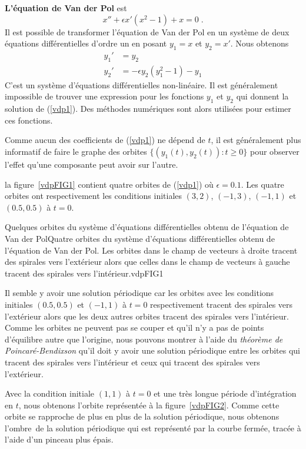 {\begin{egg}
{\bfseries L'équation de Van der Pol} est
\[
x'' + \epsilon x'(x^2-1) + x = 0 \; .
\]
Il est possible de transformer l'équation de Van der Pol en un système de
deux équations différentielles d'ordre un en posant $y_1 = x$ et $y_2 = x'$.
Nous obtenons
\begin{equation} \label{vdp1}
\begin{split}
y_1' &= y_2 \\
y_2' &= - \epsilon y_2 (y_1^2 -1) - y_1
\end{split}
\end{equation}
C'est un système d'équations différentielles non-linéaire.  Il est
généralement impossible de trouver une expression pour les fonctions $y_1$ et
$y_2$ qui donnent la solution de (\ref{vdp1}).  Des méthodes
numériques sont alors utilisées pour estimer ces fonctions.

Comme aucun des coefficients de (\ref{vdp1}) ne dépend de $t$, il est
généralement plus informatif de faire le graphe des orbites
$\{(y_1(t), y_2(t)) : t\geq 0 \}$ pour observer l'effet qu'une composante
peut avoir sur l'autre.

la figure~\ref{vdpFIG1} contient quatre orbites de (\ref{vdp1}) où
$\epsilon = 0.1$.  Les quatre orbites ont respectivement les conditions
initiales $(3,2)$, $(-1,3)$, $(-1,1)$ et $(0.5,0.5)$ à $t=0$.

{Quelques orbites du système d'équations différentielles obtenu de
l'équation de Van der Pol}{Quatre orbites du système d'équations
différentielles obtenu de l'équation de Van der Pol.  Les orbites dans
le champ de vecteurs à droite tracent des spirales vers l'extérieur
alors que celles dans le champ de vecteurs à gauche tracent des
spirales vers l'intérieur.}{vdpFIG1}

Il semble y avoir une solution périodique car les orbites avec les
conditions initiales $(0.5,0.5)$ et $(-1,1)$ à $t=0$ respectivement tracent
des spirales vers l'extérieur alors que les deux autres orbites tracent des
spirales vers l'intérieur.  Comme les orbites ne peuvent pas se couper et
qu'il n'y a pas de points d'équilibre autre que l'origine, nous
pouvons montrer à l'aide du {\em théorème de Poincaré-Bendixson} qu'il
doit y avoir une solution périodique entre les orbites qui tracent des
spirales vers l'intérieur et ceux qui tracent des spirales vers l'extérieur.

Avec la condition initiale $(1,1)$ à $t=0$ et une très longue période
d'intégration en $t$, nous obtenons l'orbite représentée à la
figure~\ref{vdpFIG2}.  Comme cette orbite se rapproche de plus en plus
de la solution périodique, nous obtenons \flqq l'ombre\frqq\ de la
solution périodique qui est représenté par la courbe fermée, tracée à
l'aide d'un pinceau plus épais.


\end{egg}}
